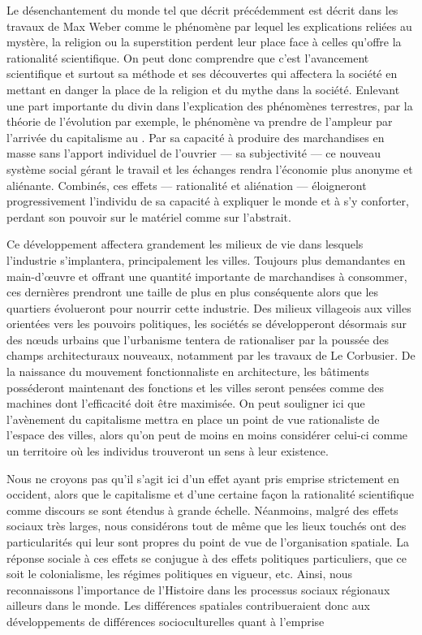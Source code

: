 Le désenchantement du monde tel que décrit précédemment est décrit dans les travaux de Max Weber comme le phénomène par lequel les explications reliées au mystère, la religion ou la superstition perdent leur place face à celles qu'offre la rationalité scientifique.
On peut donc comprendre que c'est l'avancement scientifique et surtout sa méthode et ses découvertes qui affectera la société en mettant en danger la place de la religion et du mythe dans la société.
Enlevant une part importante du divin dans l'explication des phénomènes terrestres, par la théorie de l'évolution par exemple, le phénomène va prendre de l'ampleur par l'arrivée du capitalisme au .
Par sa capacité à produire des marchandises en masse sans l'apport individuel de l'ouvrier --- sa subjectivité --- ce nouveau système social gérant le travail et les échanges rendra l'économie plus anonyme et aliénante.
Combinés, ces effets --- rationalité et aliénation --- éloigneront progressivement l'individu de sa capacité à expliquer le monde et à s'y conforter, perdant son pouvoir sur le matériel comme sur l'abstrait.

Ce développement affectera grandement les milieux de vie dans lesquels l'industrie s'implantera, principalement les villes.
Toujours plus demandantes en main-d’œuvre et offrant une quantité importante de marchandises à consommer, ces dernières prendront une taille de plus en plus conséquente alors que les quartiers évolueront pour nourrir cette industrie.
Des milieux villageois aux villes orientées vers les pouvoirs politiques, les sociétés se développeront désormais sur des nœuds urbains que l'urbanisme tentera de rationaliser par la poussée des champs architecturaux nouveaux, notamment par les travaux de Le Corbusier.
De la naissance du mouvement fonctionnaliste en architecture, les bâtiments posséderont maintenant des fonctions et les villes seront pensées comme des machines dont l'efficacité doit être maximisée\missref{}.
On peut souligner ici que l'avènement du capitalisme mettra en place un point de vue rationaliste de l'espace des villes, alors qu'on peut de moins en moins considérer celui-ci comme un territoire où les individus trouveront un sens à leur existence.

Nous ne croyons pas qu'il s'agit ici d'un effet ayant pris emprise strictement en occident, alors que le capitalisme et d'une certaine façon la rationalité scientifique comme discours se sont étendus à grande échelle.
Néanmoins, malgré des effets sociaux très larges, nous considérons tout de même que les lieux touchés ont des particularités qui leur sont propres du point de vue de l'organisation spatiale.
La réponse sociale à ces effets se conjugue à des effets politiques particuliers, que ce soit le colonialisme, les régimes politiques en vigueur, etc.
Ainsi, nous reconnaissons l'importance de l'Histoire dans les processus sociaux régionaux ailleurs dans le monde.
Les différences spatiales contribueraient donc aux développements de différences socioculturelles quant à l'emprise 

